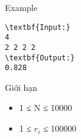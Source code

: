 Example
\begin{verbatim}
\textbf{Input:}
4
2 2 2 2
\textbf{Output:}
0.828
\end{verbatim}
Giới hạn
\begin{itemize}
	\item     1 ≤ N ≤ 10000   
	\item     1 ≤ $r_{i}$    ≤ 100000   
\end{itemize}